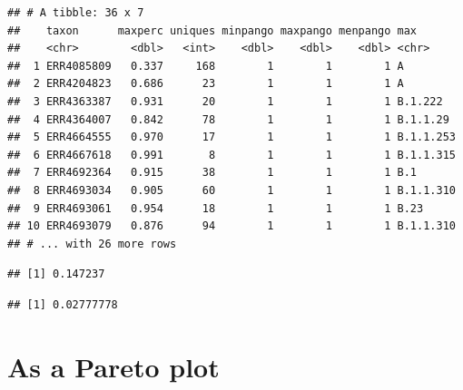 \documentclass[
]{article}
\newenvironment{Shaded}{\begin{snugshade}}{\end{snugshade}}
\newcommand{\DecValTok}[1]{\textcolor[rgb]{0.00,0.00,0.81}{#1}}
\newcommand{\KeywordTok}[1]{\textcolor[rgb]{0.13,0.29,0.53}{\textbf{#1}}}
\newcommand{\NormalTok}[1]{#1}
\newcommand{\OperatorTok}[1]{\textcolor[rgb]{0.81,0.36,0.00}{\textbf{#1}}}
\newcommand{\StringTok}[1]{\textcolor[rgb]{0.31,0.60,0.02}{#1}}
\begin{document}
\begin{verbatim}
## # A tibble: 36 x 7
##    taxon      maxperc uniques minpango maxpango menpango max      
##    <chr>        <dbl>   <int>    <dbl>    <dbl>    <dbl> <chr>    
##  1 ERR4085809   0.337     168        1        1        1 A        
##  2 ERR4204823   0.686      23        1        1        1 A        
##  3 ERR4363387   0.931      20        1        1        1 B.1.222  
##  4 ERR4364007   0.842      78        1        1        1 B.1.1.29 
##  5 ERR4664555   0.970      17        1        1        1 B.1.1.253
##  6 ERR4667618   0.991       8        1        1        1 B.1.1.315
##  7 ERR4692364   0.915      38        1        1        1 B.1      
##  8 ERR4693034   0.905      60        1        1        1 B.1.1.310
##  9 ERR4693061   0.954      18        1        1        1 B.23     
## 10 ERR4693079   0.876      94        1        1        1 B.1.1.310
## # ... with 26 more rows
\end{verbatim}

\begin{Shaded}
\end{Shaded}

\begin{verbatim}
## [1] 0.147237
\end{verbatim}

\begin{verbatim}
## [1] 0.02777778
\end{verbatim}

\hypertarget{as-a-pareto-plot}{%
\section{As a Pareto plot}\label{as-a-pareto-plot}}
\end{document}
